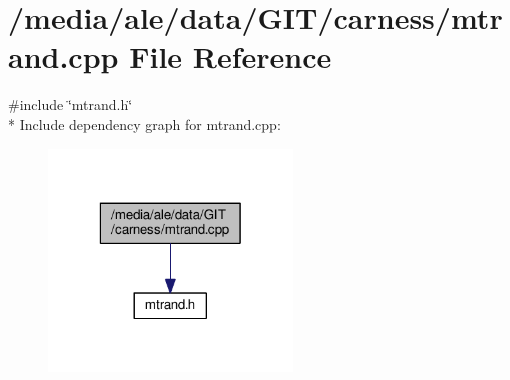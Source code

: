 \hypertarget{a00082}{\section{/media/ale/data/\-G\-I\-T/carness/mtrand.cpp File Reference}
\label{a00082}
}
{\ttfamily \#include \char`\"{}mtrand.\-h\char`\"{}}\\*
Include dependency graph for mtrand.\-cpp\-:\nopagebreak
\begin{figure}[H]
\begin{center}
\leavevmode
\includegraphics[width=184pt]{a00155}
\end{center}
\end{figure}
